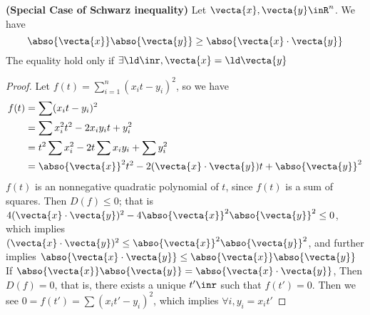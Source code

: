 \documentclass{report}
\begin{document}
\begin{theorem}
\label{1.5.6}
\textbf{(Special Case of Schwarz inequality)}  Let  $\vecta{x},\vecta{y}\inR^n$. We have  
 \begin{equation*}
\abso{\vecta{x}}\abso{\vecta{y}}\geq \abso{\vecta{x}\cdot \vecta{y}}
\end{equation*}
The equality hold only if $\exists \ld\inr, \vecta{x}=\ld\vecta{y}$
\end{theorem}
\begin{proof}
Let $f(t)=\sum_{i=1}^{n}(x_it-y_i)^2$, so we have
\begin{align*}
f(t)&=\sum (x_it-y_i)^2\\
&=\sum x_i^2t^2-2x_iy_it+y_i^2 \\
&=t^2\sum x_i^2 -2t\sum x_iy_i+\sum y_i^2\\
&=\abso{\vecta{x}}^2t^2-2(\vecta{x}\cdot\vecta{y})t+\abso{\vecta{y}}^2
\end{align*}
$f(t)$ is an nonnegative quadratic polynomial of $t$, since $f(t)$ is a sum of squares. Then $D(f)\leq 0$; that is $4(\vecta{x}\cdot\vecta{y})^2-4\abso{\vecta{x}}^2\abso{\vecta{y}}^2\leq 0$, which implies $(\vecta{x}\cdot\vecta{y})^2\leq \abso{\vecta{x}}^2\abso{\vecta{y}}^2$, and further implies $\abso{\vecta{x}\cdot \vecta{y}}\leq \abso{\vecta{x}}\abso{\vecta{y}}$     \\

If $\abso{\vecta{x}}\abso{\vecta{y}}=\abso{\vecta{x}\cdot\vecta{y}}$, Then $D(f)=0$, that is, there exists a unique $t'\inr$ such that $f(t')=0$. Then we see $0=f(t')=\sum (x_it'-y_i)^2$, which implies $\forall i, y_i=x_it'$
\end{proof}
\renewcommand{\inC}{\in\C}
\end{document}
